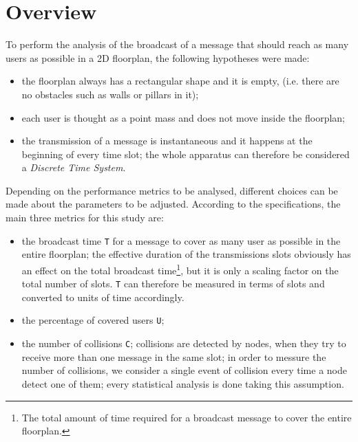 %
\chapter{Overview}\label{overview}
To perform the analysis of the broadcast of a message that should reach as many
users as possible in a 2D floorplan, the following hypotheses were made:
\begin{itemize}
	\item the floorplan always has a rectangular shape and it is empty, (i.e.
	there are no obstacles such as walls or pillars in it);
	\item each user is thought as a point mass and does not move inside the
	floorplan;
	\item the transmission of a message is instantaneous and it happens at the
	beginning of every time slot; the whole apparatus can therefore be
	considered a \textit{Discrete Time System}.
\end{itemize}
Depending on the performance metrics to be analysed, different choices can be
made about the parameters to be adjusted. According to the specifications, the
main three metrics for this study are:
\begin{itemize}
	\item the broadcast time \colorbox{gray!30}{\large \texttt{T}} for a message
	to cover as many user as possible in the entire floorplan; the effective
	duration of the transmissions slots obviously has an effect
	on the total broadcast time\footnote{The total amount of time required for a
	broadcast message to cover the entire floorplan.}, but it is only a scaling
	factor on the total number of slots. \texttt{T} can therefore be measured in
	terms of slots and converted to units of time accordingly.
	\item the percentage of covered users \colorbox{gray!30}{\large \texttt{U}};
	\item the number of collisions \colorbox{gray!30}{\large \texttt{C}};
	collisions are detected by nodes, when they try to receive more than one
	message in the same slot; in order to messure the number of collisions, we
	consider a single event of collision every time a node detect one of them;
	every statistical analysis is done taking this assumption.
\end{itemize}
